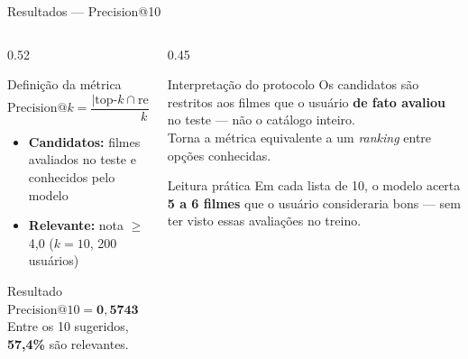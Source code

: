 \documentclass[aspectratio=169,10pt]{beamer}
\begin{document}
\begin{frame}{Resultados — Precision@10}
  \begin{columns}[T]
    \begin{column}{0.52\textwidth}
      \begin{block}{Definição da métrica}
        \small
        \[ \text{Precision@}k = \frac{|\text{top-}k \cap \text{relevantes}|}{k} \]
        \vskip -4pt
        \begin{itemize}
          \item \textbf{Candidatos:} filmes avaliados no teste e conhecidos pelo modelo
          \item \textbf{Relevante:} nota $\geq$ 4,0 \quad ($k = 10$, 200 usuários)
        \end{itemize}
      \end{block}
      \vskip 3pt
      \begin{block}{Resultado}
        \small\centering
        $\text{Precision@10} = \mathbf{0{,}5743}$\\[2pt]
        Entre os 10 sugeridos, \textbf{57,4\%} são relevantes.
      \end{block}
    \end{column}
    \begin{column}{0.45\textwidth}
      \begin{alertblock}{Interpretação do protocolo}
        \small Os candidatos são restritos aos filmes que o usuário \textbf{de fato avaliou} no teste — não o catálogo inteiro.\\[2pt]
        Torna a métrica equivalente a um \emph{ranking} entre opções conhecidas.
      \end{alertblock}
      \vskip 3pt
      \begin{exampleblock}{Leitura prática}
        \small Em cada lista de 10, o modelo acerta \textbf{5 a 6 filmes} que o usuário consideraria bons — sem ter visto essas avaliações no treino.
      \end{exampleblock}
    \end{column}
  \end{columns}
\end{frame}
\end{document}
